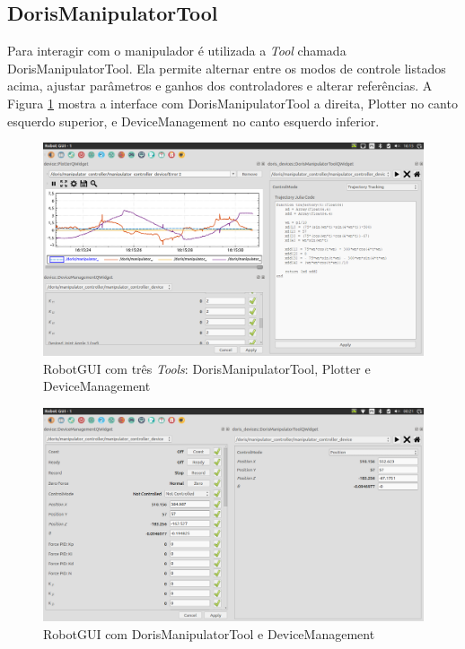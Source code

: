 \subsection{DorisManipulatorTool}
Para interagir com o manipulador é utilizada a \textit{Tool} chamada DorisManipulatorTool. Ela permite alternar entre os modos de controle listados acima, ajustar parâmetros e ganhos dos controladores e alterar referências. A Figura \ref{fig:screenshot1} mostra a interface com DorisManipulatorTool a direita,  Plotter no canto esquerdo superior, e DeviceManagement no canto esquerdo inferior.
 
\begin{figure}[!h]
  \centering
  \includegraphics[width=\linewidth]{./img/screenshot/sc1.png}
  \caption{RobotGUI com três \textit{Tools}: DorisManipulatorTool, Plotter e DeviceManagement}
  \label{fig:screenshot1}
\end{figure}


\begin{figure}[!h]
  \centering
  \includegraphics[width=\linewidth]{./img/screenshot/sc2.png}
  \caption{RobotGUI com DorisManipulatorTool e DeviceManagement}
  \label{fig:screenshot2}
\end{figure}

